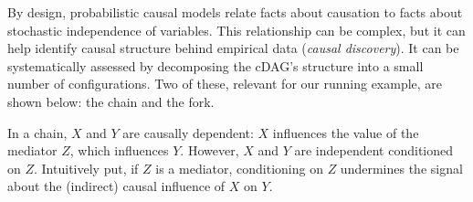 \documentclass[nobib]{tufte-handout}
\begin{document}
\begin{InfoBox}
{\begin{minipage}{1\textwidth}
    By design, probabilistic causal models relate facts about causation to facts about stochastic independence of variables.
    This relationship can be complex, but it can help identify causal structure behind empirical data (\textit{causal discovery}). It can be systematically assessed by decomposing the cDAG's structure into a small number of configurations.
    Two of these, relevant for our running example, are shown below: the chain and the fork.

    \begin{center}
    \end{center}

    \vspace{-1.25cm}
    In a chain, $X$ and $Y$ are causally dependent: $X$ influences the value of the mediator $Z$, which influences $Y$.
    However, $X$ and $Y$ are independent conditioned on $Z$.
    Intuitively put, if $Z$ is a mediator, conditioning on $Z$ undermines the signal about the (indirect) causal influence of $X$ on $Y$.


\end{minipage}}
\end{InfoBox}
\end{document}
